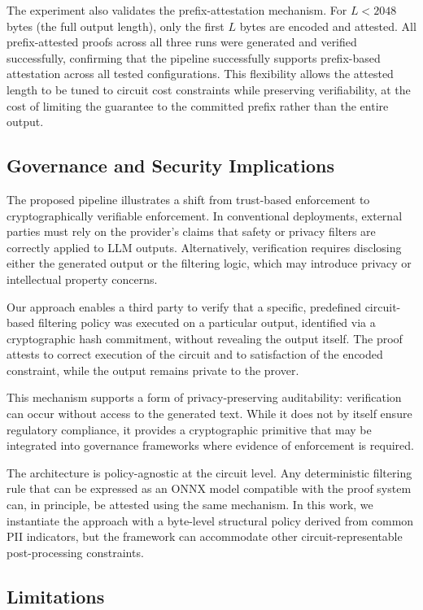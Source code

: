 \documentclass[10pt,conference,a4paper]{IEEEtran}
\begin{document}
The experiment also validates the prefix-attestation mechanism. For $L < 2048$ bytes (the full output length), only the first $L$ bytes are encoded and attested. All prefix-attested proofs across all three runs were generated and verified successfully, confirming that the pipeline successfully supports prefix-based attestation across all tested configurations. This flexibility allows the attested length to be tuned to circuit cost constraints while preserving verifiability, at the cost of limiting the guarantee to the committed prefix rather than the entire output.

\subsection{Governance and Security Implications}

The proposed pipeline illustrates a shift from trust-based enforcement to cryptographically verifiable enforcement. In conventional deployments, external parties must rely on the provider’s claims that safety or privacy filters are correctly applied to LLM outputs. Alternatively, verification requires disclosing either the generated output or the filtering logic, which may introduce privacy or intellectual property concerns.

Our approach enables a third party to verify that a specific, predefined circuit-based filtering policy was executed on a particular output, identified via a cryptographic hash commitment, without revealing the output itself. The proof attests to correct execution of the circuit and to satisfaction of the encoded constraint, while the output remains private to the prover.

This mechanism supports a form of privacy-preserving auditability: verification can occur without access to the generated text. While it does not by itself ensure regulatory compliance, it provides a cryptographic primitive that may be integrated into governance frameworks where evidence of enforcement is required.

The architecture is policy-agnostic at the circuit level. Any deterministic filtering rule that can be expressed as an ONNX model compatible with the proof system can, in principle, be attested using the same mechanism. In this work, we instantiate the approach with a byte-level structural policy derived from common PII indicators, but the framework can accommodate other circuit-representable post-processing constraints.

\subsection{Limitations}
\end{document}
